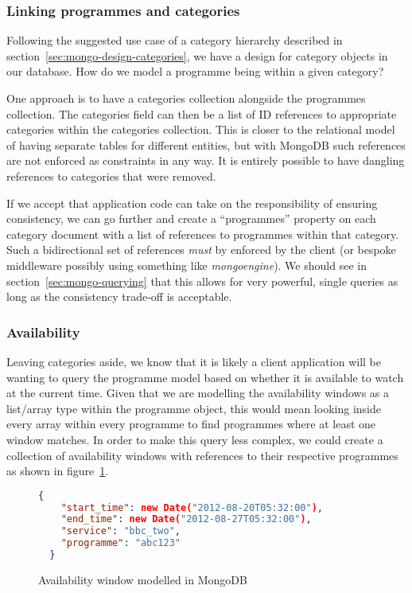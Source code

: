 \documentclass[11pt,a4paper]{article}
\begin{document}
\subsubsection{Linking programmes and categories}

Following the suggested use case of a category hierarchy described
in section~\ref{sec:mongo-design-categories}, we have a design for
category objects in our database. How do we model a programme
being within a given category?

One approach is to have a categories collection alongside the
programmes collection. The categories field can then be a list
of ID references to appropriate categories within the categories
collection. This is closer to the relational model of having
separate tables for different entities, but with MongoDB such
references are not enforced as constraints in any way. It is
entirely possible to have dangling references to categories
that were removed.

If we accept that application code can take on the responsibility
of ensuring consistency, we can go further and create a
``programmes'' property on each category document with a list
of references to programmes within that category. Such a bidirectional
set of references \emph{must} by enforced by the client (or bespoke
middleware possibly using something like \emph{mongoengine}). We
should see in section~\ref{sec:mongo-querying} that this allows for
very powerful, single queries as long as the consistency trade-off
is acceptable.

\subsubsection{Availability}

Leaving categories aside, we know that it is likely a client
application will be wanting to query the programme model based
on whether it is available to watch at the current time. Given
that we are modelling the availability windows as a list/array
type within the programme object, this would mean looking inside
every array within every programme to find programmes where
at least one window matches. In order to make this query
less complex, we could create a collection of availability
windows with references to their respective programmes as shown
in figure~\ref{fig:mongo-availability-window}.

\begin{figure}[p]
\begin{lstlisting}[language=json]
  {
    "start_time": new Date("2012-08-20T05:32:00"),
    "end_time": new Date("2012-08-27T05:32:00"),
    "service": "bbc_two",
    "programme": "abc123"
  }
\end{lstlisting}
  \caption{Availability window modelled in MongoDB}
  \label{fig:mongo-availability-window}
\end{figure}
\end{document}
